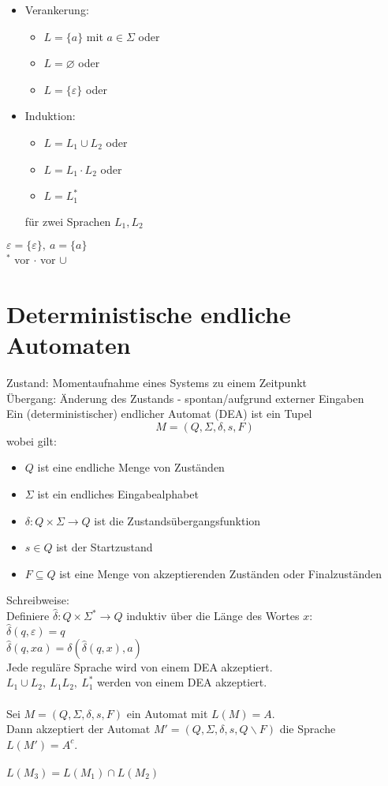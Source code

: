 \documentclass[a4paper]{article}
\let\epsilon\varepsilon
\begin{document}
\begin{itemize}
	\item Verankerung:
	\begin{itemize}
		\item $L=\{a\}$ mit $a\in\Sigma$ oder
		\item $L=\varnothing$ oder
		\item $L=\{\epsilon\}$ oder
	\end{itemize}
	\item Induktion:
	\begin{itemize}
		\item $L=L_1\cup L_2$ oder
		\item $L=L_1\cdot L_2$ oder
		\item $L=L_1^*$
	\end{itemize}
	für zwei Sprachen $L_1,L_2$
\end{itemize}
$\epsilon=\{\epsilon\},\ a=\{a\}$\\
$^*$ vor $\cdot$ vor $\cup$
\section{Deterministische endliche Automaten}
Zustand: Momentaufnahme eines Systems zu einem Zeitpunkt\\
Übergang: Änderung des Zustands - spontan/aufgrund externer Eingaben\\
Ein (deterministischer) endlicher Automat (DEA) ist ein Tupel $$M=\left(Q,\Sigma,\delta,s,F\right)$$
wobei gilt:
\begin{itemize}
\item $Q$ ist eine endliche Menge von Zuständen
\item $\Sigma$ ist ein endliches Eingabealphabet
\item $\delta:Q\times \Sigma \rightarrow Q$ ist die Zustandsübergangsfunktion
\item $s\in Q$ ist der Startzustand
\item $F\subseteq Q$ ist eine Menge von akzeptierenden Zuständen oder Finalzuständen
\end{itemize}
Schreibweise:\\
Definiere $\hat{\delta}:Q\times\Sigma^*\rightarrow Q$ induktiv über die Länge des Wortes $x$:\\
$\hat{\delta}(q,\epsilon)=q$\\
$\hat{\delta}(q,xa)=\delta(\hat{\delta}(q,x),a)$\\
Jede reguläre Sprache wird von einem DEA akzeptiert.\\
$L_1\cup L_2,\ L_1L_2,\ L_1^*$ werden von einem DEA akzeptiert.\\\\
Sei $M=\left(Q,\Sigma,\delta,s,F\right)$ ein Automat mit $L(M)=A$.\\
Dann akzeptiert der Automat $M'=\left(Q,\Sigma,\delta,s,Q\backslash F\right)$ die Sprache $L(M')=A^c$.\\\\
$L(M_3)=L(M_1)\cap L(M_2)$
\end{document}
